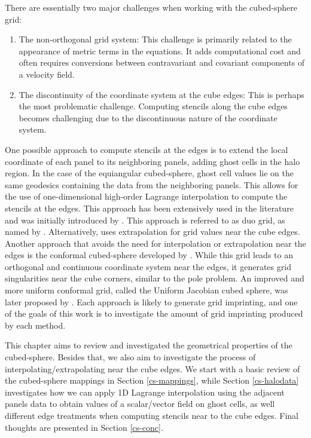 There are essentially two major challenges when working with the cubed-sphere grid:
\begin{enumerate}
\item
The non-orthogonal grid system: This challenge is primarily related to the appearance of
metric terms in the equations. It adds computational cost and often requires conversions
between contravariant and covariant components of a velocity field.
\item
The discontinuity of the coordinate system at the cube edges: This is perhaps the most 
problematic challenge. Computing stencils along the cube edges becomes challenging due to 
the discontinuous nature of the coordinate system.
\end{enumerate}
One possible approach to compute stencils at the edges is to extend the local coordinate 
of each panel to its neighboring panels, adding ghost cells in the halo region. In the 
case of the equiangular cubed-sphere, ghost cell values lie on the same geodesics 
containing the data from the neighboring panels. This allows for the use of one-dimensional
high-order Lagrange interpolation to compute the stencils at the edges. 
This approach has been extensively used in the literature \citep{croisille:2013, 
katta:2015, katta:2015b, chen:2021} and was initially introduced by \citet{ronchi:1996}.
This approach is referred to as duo grid, as named by \citet{chen:2021}.
Alternatively, \citet{putman:2007} uses extrapolation for grid values near the cube edges.
Another approach that avoids the need for interpolation or extrapolation near the edges is 
the conformal cubed-sphere developed by \citet{rancic:1996}. While this grid leads to an 
orthogonal and continuous coordinate system near the edges, it generates grid singularities
near the cube corners, similar to the pole problem. 
An improved and more uniform conformal grid, called the Uniform Jacobian cubed sphere, was 
later proposed by \citet{rancic:2017}.
Each approach is likely to generate grid imprinting, and one of the goals of this work is 
to investigate the amount of grid imprinting produced by each method.

This chapter aims to review and investigated the geometrical properties
of the cubed-sphere. Besides that, we also aim to investigate the process
of interpolating/extrapolating near the cube edges.
We start with a basic review of the cubed-sphere mappings in Section \ref{cs-mappings},
while Section \ref{cs-halodata} investigates how we can apply 1D Lagrange interpolation using the adjacent panels
data to obtain values of a scalar/vector field on ghost cells, as well different edge
treatments when computing stencils near to the cube edges.
Final thoughts are presented in Section \ref{cs-conc}.

